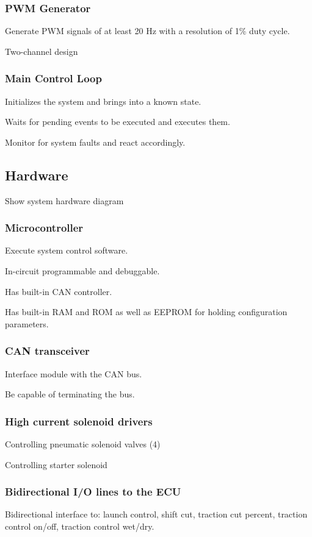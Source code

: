 \subsubsection{PWM Generator}

Generate PWM signals of at least 20 Hz with a resolution of 1\% duty
cycle.

Two-channel design


\subsubsection{Main Control Loop}

Initializes the system and brings into a known state.

Waits for pending events to be executed and executes them.

Monitor for system faults and react accordingly.


\subsection{Hardware}

Show system hardware diagram


\subsubsection{Microcontroller}

Execute system control software.

In-circuit programmable and debuggable.

Has built-in CAN controller.

Has built-in RAM and ROM as well as EEPROM for holding configuration parameters.


\subsubsection{CAN transceiver}

Interface module with the CAN bus.

Be capable of terminating the bus.


\subsubsection{High current solenoid drivers}

Controlling pneumatic solenoid valves (4)

Controlling starter solenoid


\subsubsection{Bidirectional I/O lines to the ECU}

Bidirectional interface to: launch control, shift cut, traction cut percent, traction control on/off, traction control wet/dry.